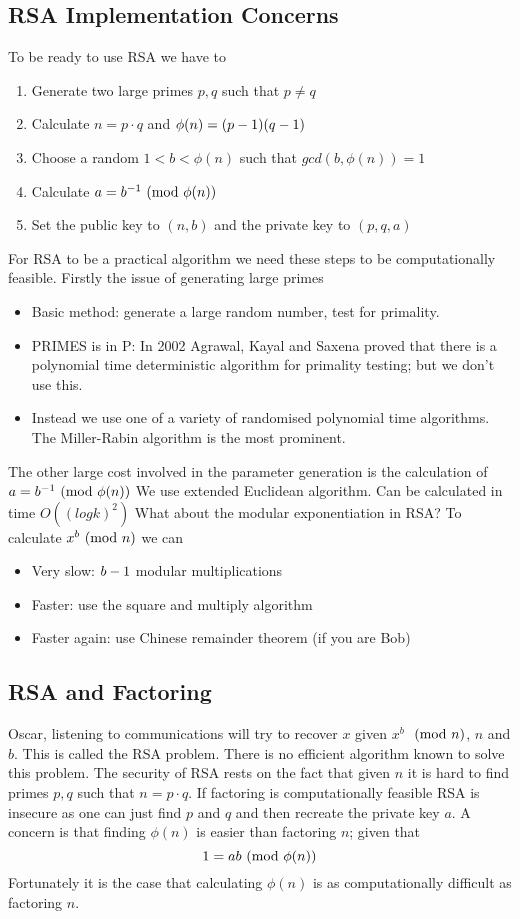 \subsection{RSA Implementation Concerns}
To be ready to use RSA we have to
\begin{enumerate}
    \item Generate two large primes $p, q$ such that $p \neq q$
    \item Calculate $n = p \cdot q$ and $\phi(n) = (p - 1) (q - 1)$
    \item Choose a random $1 < b < \phi(n)$ such that $gcd(b, \phi(n)) = 1$
    \item Calculate $a = b^{-1} \ (\mathrm{mod}\ \phi(n))$
    \item Set the public key to $(n, b)$ and the private key to $(p, q, a)$
\end{enumerate}
For RSA to be a practical algorithm we need these steps to be computationally feasible.
Firstly the issue of generating large primes
\begin{itemize}
    \item Basic method: generate a large random number, test for primality.
    \item PRIMES is in P: In 2002 Agrawal, Kayal and Saxena proved that
        there is a polynomial time deterministic algorithm for primality testing; but we don’t use this.
    \item Instead we use one of a variety of randomised polynomial time algorithms. The Miller-Rabin algorithm is the most prominent.
\end{itemize}

The other large cost involved in the parameter generation is the calculation of
$a = b^{-1} \ (\mathrm{mod}\ \phi(n))$
We use extended Euclidean algorithm.
Can be calculated in time $O((log k)^2)$
What about the modular exponentiation in RSA?
To calculate $x^b \ (\mathrm{mod}\ n)$ we can
\begin{itemize}
    \item Very slow: $b - 1$ modular multiplications
    \item Faster: use the square and multiply algorithm
    \item Faster again: use Chinese remainder theorem (if you are Bob)
\end{itemize}

\subsection{RSA and Factoring}
Oscar, listening to communications will try to recover $x$ given $x^b$ $\ (\mathrm{mod}\ n)$, $n$ and $b$.
This is called the RSA problem.
There is no efficient algorithm known to solve this problem.
The security of RSA rests on the fact that given $n$
it is hard to find primes $p,q$ such that $n = p \cdot q$.
If factoring is computationally feasible RSA is insecure
as one can just find $p$ and $q$ and then recreate the private key $a$.
A concern is that finding $\phi(n)$ is easier than factoring $n$;
given that $$1 = ab \ (\mathrm{mod}\ \phi(n))$$
Fortunately it is the case that calculating $\phi(n)$ is as computationally difficult as factoring $n$.

